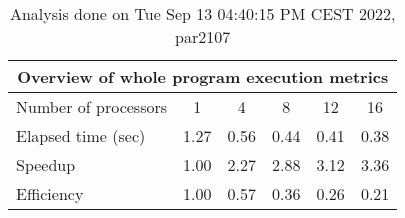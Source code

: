 \begin{table}[h]
\begin{center}
\begin{tabular}{|l|c|c|c|c|c|}
\hline
\multicolumn{6}{|c|}{Overview of whole program execution metrics} \\
\hline
\hline
Number of processors & 1 & 4 & 8 & 12 & 16 \\
\hline
Elapsed time (sec)      &       1.27 &       0.56 &       0.44 &       0.41 &       0.38 \\
\hline
Speedup                 &       1.00 &       2.27 &       2.88 &       3.12 &       3.36 \\
\hline
Efficiency              &       1.00 &       0.57 &       0.36 &       0.26 &       0.21 \\
\hline
\end{tabular}
\end{center}
\caption{ Analysis done on Tue Sep 13 04:40:15 PM CEST 2022, par2107}
\end{table}
